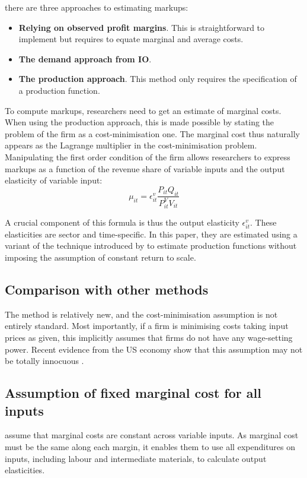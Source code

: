 \documentclass{amsart}
\theoremstyle{definition}
\theoremstyle{remark}
\numberwithin{equation}{section}
\begin{document}
there are three approaches to estimating markups:
\begin{itemize}
    \item \textbf{Relying on observed profit margins}. This is straightforward to implement but requires to equate marginal and average costs.
    \item \textbf{The demand approach from IO}.
    \item \textbf{The production approach}. This method only requires the specification of a production function.
\end{itemize}

To compute markups, researchers need to get an estimate of marginal costs. When using the production approach, this is made possible by stating the problem of the firm as a cost-minimisation one. The marginal cost thus naturally appears as the Lagrange multiplier in the cost-minimisation problem. Manipulating the first order condition of the firm allows researchers to express markups as a function of the revenue share of variable inputs and the output elasticity of variable input: $$\mu_{i t}=\epsilon_{i t}^v \frac{P_{i t} Q_{i t}}{P_{i t}^{V} V_{i t}}$$

A crucial component of this formula is thus the output elasticity $\epsilon_{i t}^v$. These elasticities are sector and time-specific. In this paper, they are estimated using a variant of the technique introduced by \cite{olley1996dynamics} to estimate production functions without imposing the assumption of constant return to scale. \\

\subsection*{Comparison with other methods} The method is relatively new, and the cost-minimisation assumption is not entirely standard. Most importantly, if a firm is minimising costs taking input prices as given, this implicitly assumes that firms do not have any wage-setting power. Recent evidence from the US economy show that this assumption may not be totally innocuous \citep{council2016labor}.\\

\subsection*{Assumption of fixed marginal cost for all inputs} \cite{de2019rise} assume that marginal costs are constant across variable inputs. As marginal cost must be the same along each margin, it enables them to use all expenditures on inputs, including labour and intermediate materials, to calculate output elasticities. 
\end{document}
